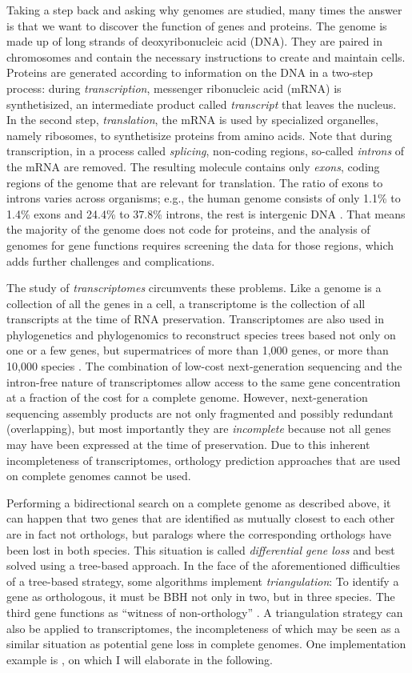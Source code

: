 Taking a step back and asking why genomes are studied, many times the answer is
that we want to discover the function of genes and proteins. The genome is made
up of long strands of deoxyribonucleic acid (DNA). They are paired in
chromosomes and contain the necessary instructions to create and maintain cells.
Proteins are generated according to information on the DNA in a two-step
process: during \emph{transcription}, messenger ribonucleic acid (mRNA) is
synthetisized, an intermediate product called \emph{transcript} that leaves the
nucleus. In the second step, \emph{translation}, the mRNA is used by specialized
organelles, namely ribosomes, to synthetisize proteins from amino acids. Note
that during transcription, in a process called \emph{splicing}, non-coding
regions, so-called \emph{introns} of the mRNA are removed. The resulting
molecule contains only \emph{exons}, coding regions of the genome that are
relevant for translation. The ratio of exons to introns varies across organisms;
e.g., the human genome consists of only 1.1\% to 1.4\% exons and 24.4\% to
37.8\% introns, the rest is intergenic DNA \citep{venter2001}. That means the
majority of the genome does not code for proteins, and the analysis of genomes
for gene functions requires screening the data for those regions, which adds
further challenges and complications.

The study of \emph{transcriptomes} circumvents these problems. Like a genome is
a collection of all the genes in a cell, a transcriptome is the collection of
all transcripts at the time of RNA preservation. Transcriptomes are also used in
phylogenetics and phylogenomics to reconstruct species trees based not only on
one or a few genes, but supermatrices of more than 1,000 genes, or more than
10,000 species \citep{beiko2011}. The combination of low-cost next-generation
sequencing and the intron-free nature of transcriptomes allow access to the same
gene concentration at a fraction of the cost for a complete genome. However,
next-generation sequencing assembly products are not only fragmented and possibly
redundant (overlapping), but most importantly they are \emph{incomplete} because
not all genes may have been expressed at the time of preservation. Due to this
inherent incompleteness of transcriptomes, orthology prediction approaches that
are used on complete genomes cannot be used.

Performing a bidirectional search on a complete genome as described above, it
can happen that two genes that are identified as mutually closest to each other
are in fact not orthologs, but paralogs where the corresponding orthologs have
been lost in both species. This situation is called \emph{differential gene
loss} and best solved using a tree-based approach. In the face of the
aforementioned difficulties of a tree-based strategy, some algorithms implement
\emph{triangulation}: To identify a gene as orthologous, it must be BBH not only
in two, but in three species. The third gene functions as ``witness of
non-orthology'' \citep{dessimoz2006}. A triangulation strategy can also be
applied to transcriptomes, the incompleteness of which may be seen as a similar
situation as potential gene loss in complete genomes. One implementation example
is \hamstr \citep{ebersberger2009}, on which I will elaborate in the following.
